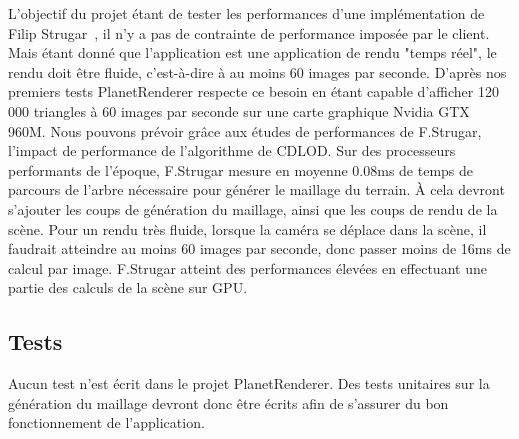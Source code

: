 L’objectif du projet étant de tester les performances d’une implémentation
de Filip Strugar~\cite{CDLOD}, il n’y a pas de contrainte de performance imposée
par le client. Mais étant donné que l'application est une application de rendu "temps réel", le rendu
doit être fluide, c'est-à-dire à au moins 60 images par seconde. 
D'après nos premiers tests PlanetRenderer respecte ce besoin en étant capable
d'afficher 120 000 triangles à 60 images par seconde sur une carte
graphique Nvidia GTX 960M. Nous pouvons prévoir grâce aux études de performances de
F.Strugar, l’impact de performance de l’algorithme de CDLOD. Sur
des processeurs performants de l’époque, F.Strugar mesure en moyenne
0.08ms de temps de parcours de l’arbre nécessaire pour générer le maillage
du terrain. À cela devront s’ajouter les coups de génération du maillage, ainsi
que les coups de rendu de la scène. Pour un rendu très fluide, lorsque la caméra
se déplace dans la scène, il faudrait atteindre au moins 60 images par
seconde, donc passer moins de 16ms de calcul par image. F.Strugar atteint
des performances élevées en effectuant une partie des calculs de la scène
sur GPU.



\subsection{Tests}

Aucun test n'est écrit dans le projet PlanetRenderer. Des tests
unitaires sur la génération du maillage devront donc être écrits afin de
s'assurer du bon fonctionnement de l'application.
